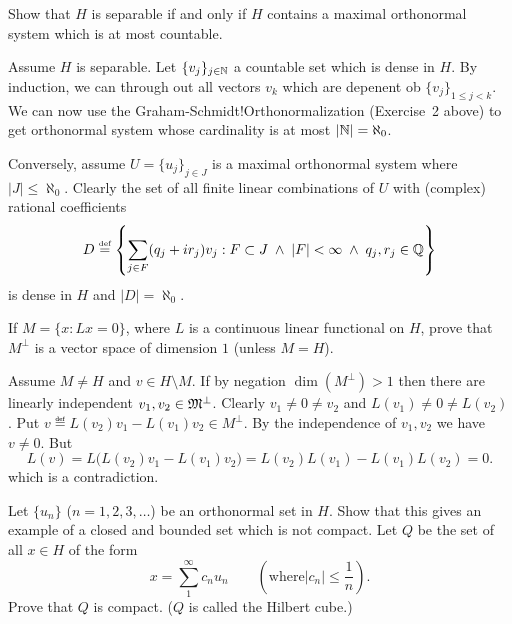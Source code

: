 \begin{enumerate}
\begin{excopy}
Show that $H$ is separable if and only if $H$ contains a maximal orthonormal
system which is at most countable.
\end{excopy}

Assume $H$ is separable.
Let \(\{v_j\}_{j\in\mathbb{N}}\) a countable set which is dense in $H$.
By induction, we can through out all vectors \(v_k\)
which are depenent ob \(\{v_j\}_{1\leq j<k}\).
We can now use the
Graham-Schmidt!Orthonormalization (Exercise~2 above) to get orthonormal
system whose cardinality is at most \(|\mathbb{N}| = \aleph_0\).

Conversely, assume \(U=\{u_j\}_{j\in J}\) is a maximal orthonormal system
where \(|J| \leq \aleph_0\).
Clearly the set
of all finite linear combinations of $U$ with (complex) rational coefficients
\begin{equation*}
D \stackrel{\mbox{\upshape\tiny def}}{=} \left\{\sum_{j\in F} (q_j+ir_j)v_j :
    F\subset J \;\wedge\;
   |F|<\infty \;\wedge\;
   q_j, r_j \in \mathbb{Q}\right\}
\end{equation*}
is dense in $H$ and \(|D|=\aleph_0\).


\begin{excopy}
If \(M = \{x: Lx = 0\}\), where $L$ is a continuous linear functional on $H$,
prove that \(M^\perp\) is a vector space of dimension $1$ (unless \(M=H\)).
\end{excopy}

Assume \(M\neq H\) and \(v\in H\setminus M\).
If by negation \(\dim(M^\perp)> 1 \) then there are
linearly independent \(v_1,v_2\in \mathfrak{M}^\perp\).
Clearly \(v_1\neq 0 \neq v_2\)
and \(L(v_1)\neq 0 \neq L(v_2)\).
Put \(v \eqdef L(v_2)v_1 - L(v_1)v_2 \in M^\perp\).
By the independence of \(v_1,v_2\) we have \(v\neq 0\).
But
\begin{equation*}
L(v) = L\bigl( L(v_2)v_1 - L(v_1)v_2 \bigr) = L(v_2)L(v_1) - L(v_1)L(v_2) = 0.
\end{equation*}
which is a contradiction.


\begin{excopy}
Let \(\{u_n\}\) (\(n=1,2,3,\ldots\)) be an orthonormal set in $H$.
Show that this gives an example of a closed and bounded set which is
not compact.
Let $Q$ be the set of all \(x\in H\) of the form
\begin{equation*}
x = \sum_1^\infty c_n u_n
   \qquad \left(\textrm{where} |c_n| \leq \frac{1}{n}\right).
\end{equation*}
Prove that $Q$ is compact. ($Q$ is called the Hilbert cube.)


\end{excopy}
\end{enumerate}
